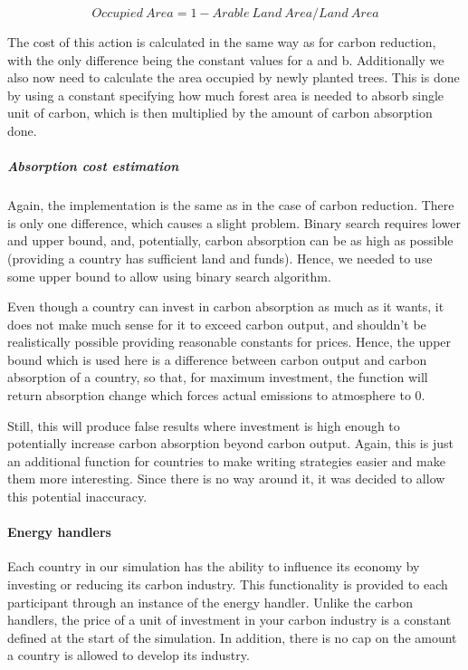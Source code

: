 $$
Occupied~Area= 1 - Arable~Land~Area / Land~Area
$$

The cost of this action is calculated in the same way as for carbon reduction, with the only difference being the constant values for a and b. Additionally we also now need to calculate the area occupied by newly planted trees. This is done by using a constant specifying how much forest area is needed to absorb single unit of carbon, which is then multiplied by the amount of carbon absorption done.

\subparagraph{Absorption cost estimation}

Again, the implementation is the same as in the case of carbon reduction. There is only one difference, which causes a slight problem. Binary search requires lower and upper bound, and, potentially, carbon absorption can be as high as possible (providing a country has sufficient land and funds). Hence, we needed to use some upper bound to allow using binary search algorithm.

Even though a country can invest in carbon absorption as much as it wants, it does not make much sense for it to exceed carbon output, and shouldn't be realistically possible providing reasonable constants for prices. Hence, the upper bound which is used here is a difference between carbon output and carbon absorption of a country, so that, for maximum investment, the function will return absorption change which forces actual emissions to atmosphere to 0.

Still, this will produce false results where investment is high enough to potentially increase carbon absorption beyond carbon output. Again, this is just an additional function for countries to make writing strategies easier and make them more interesting. Since there is no way around it, it was decided to allow this potential inaccuracy.

\paragraph{Energy handlers}

Each country in our simulation has the ability to influence its economy by investing or reducing its carbon industry. This functionality is provided to each participant through an instance of the energy handler. Unlike the carbon handlers, the price of a unit of investment in your carbon industry is a constant defined at the start of the simulation. In addition, there is no cap on the amount a country is allowed to develop its industry. 

